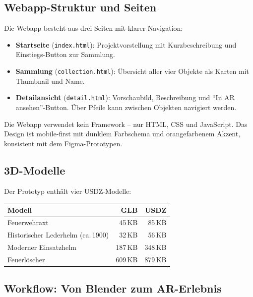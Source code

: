 \documentclass[11pt,a4paper]{article}
\begin{document}
\subsection*{Webapp-Struktur und Seiten}

Die Webapp besteht aus drei Seiten mit klarer Navigation:

\begin{itemize}
  \item \textbf{Startseite} (\texttt{index.html}): Projektvorstellung mit Kurzbeschreibung und Einstiegs-Button zur Sammlung.
  \item \textbf{Sammlung} (\texttt{collection.html}): Übersicht aller vier Objekte als Karten mit Thumbnail und Name.
  \item \textbf{Detailansicht} (\texttt{detail.html}): Vorschaubild, Beschreibung und ``In AR ansehen''-Button. Über Pfeile kann zwischen Objekten navigiert werden.
\end{itemize}

Die Webapp verwendet kein Framework -- nur HTML, CSS und JavaScript. Das Design ist mobile-first mit dunklem Farbschema und orangefarbenem Akzent, konsistent mit dem Figma-Prototypen.

\subsection*{3D-Modelle}

Der Prototyp enthält vier USDZ-Modelle:

\begin{center}
\begin{tabular}{lrr}
\toprule
\textbf{Modell} & \textbf{GLB} & \textbf{USDZ} \\
\midrule
Feuerwehraxt  & 45\,KB & 85\,KB \\
Historischer Lederhelm (ca.\,1900) & 32\,KB & 56\,KB \\
Moderner Einsatzhelm & 187\,KB & 348\,KB \\
Feuerlöscher & 609\,KB & 879\,KB \\
\bottomrule
\end{tabular}
\end{center}

\subsection*{Workflow: Von Blender zum AR-Erlebnis}
\end{document}
